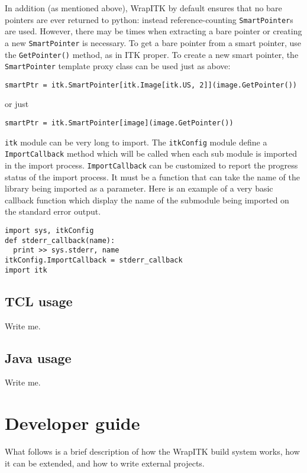 \documentclass{InsightArticle}
\begin{document}
In addition (as mentioned above), WrapITK by default ensures that no bare
pointers are ever returned to python: instead reference-counting \verb$SmartPointer$s
are used. However, there may be times when extracting a bare pointer or creating
a new \verb$SmartPointer$ is necessary. To get a bare pointer from a smart pointer, use
the \verb$GetPointer()$ method, as in ITK proper. To create a new smart pointer, the
\verb$SmartPointer$ template proxy class can be used just as above:
\small \begin{verbatim}
smartPtr = itk.SmartPointer[itk.Image[itk.US, 2]](image.GetPointer())
\end{verbatim} \normalsize
or just
\small \begin{verbatim}
smartPtr = itk.SmartPointer[image](image.GetPointer())
\end{verbatim} \normalsize

\verb$itk$ module can be very long to import. The \verb$itkConfig$ module define
a \verb$ImportCallback$ method which will be called when each sub module is
imported in the import process. \verb$ImportCallback$ can be customized to report the
progress status of the import process. It must be a function that can take
the name of the library being imported as a parameter. Here is an example of a very
basic callback function which display the name of the submodule being imported on
the standard error output.
\small \begin{verbatim}
import sys, itkConfig
def stderr_callback(name):
  print >> sys.stderr, name
itkConfig.ImportCallback = stderr_callback
import itk
\end{verbatim} \normalsize


    \subsection{TCL usage}

Write me.

    \subsection{Java usage}

Write me.

\section{Developer guide}

What follows is a brief description of how the WrapITK build system works, how
it can be extended, and how to write external projects.
\end{document}
